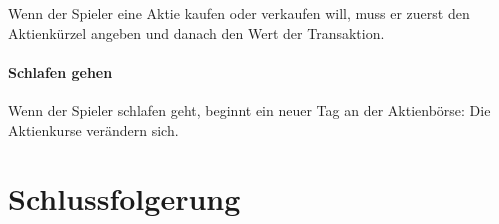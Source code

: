 \documentclass[paper=a4, fontsize=11pt]{scrartcl}
\numberwithin{equation}{section}		%
\numberwithin{figure}{section}			%
\numberwithin{table}{section}				%
\begin{document}
	Wenn der Spieler eine Aktie kaufen oder verkaufen will, muss er zuerst den Aktienkürzel angeben und danach den Wert der Transaktion.
	
	\paragraph{Schlafen gehen}
	
	Wenn der Spieler schlafen geht, beginnt ein neuer Tag an der Aktienbörse: Die Aktienkurse verändern sich. 
	
	\section{Schlussfolgerung}
	
	
	
\end{document}
